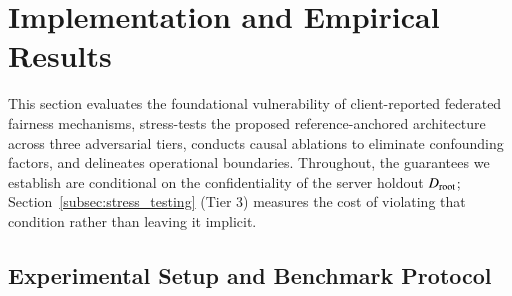 \section{Implementation and Empirical Results}
\label{sec:experiments}

This section evaluates the foundational vulnerability of client-reported federated fairness mechanisms, stress-tests the proposed reference-anchored architecture across three adversarial tiers, conducts causal ablations to eliminate confounding factors, and delineates operational boundaries. Throughout, the guarantees we establish are conditional on the confidentiality of the server holdout $D_{\mathrm{root}}$; Section~\ref{subsec:stress_testing} (Tier 3) measures the cost of violating that condition rather than leaving it implicit.

\subsection{Experimental Setup and Benchmark Protocol}
\label{subsec:setup}

